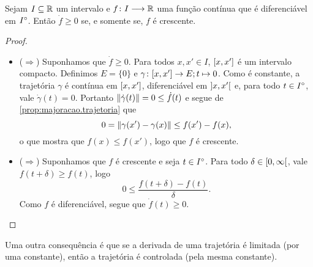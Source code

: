 \begin{proposition}
\label{prop:derivada.positiva.crescente}
Sejam $I \subseteq \mathbb{R}$ um intervalo e ${f}\colon {I} \longrightarrow {\mathbb{R}}$ uma função contínua que é diferenciável em ${I}^\circ$. Então $\dot f \geq 0$ se, e somente se, $f$ é crescente.
\end{proposition}
\begin{proof}
\begin{itemize}
\item ($\Rightarrow$) Suponhamos que $\dot f \geq 0$. Para todos $x,x' \in I$, $\left[{x},{x'}\right]$ é um intervalo compacto. Definimos $E=\{0\}$ e ${\gamma} \colon {\left[{x},{x'}\right]} \to {E}; {t} \mapsto 0$. Como é constante, a trajetória $\gamma$ é contínua em $\left[{x},{x'}\right]$, diferenciável em $\left]{x},{x'}\right[$ e, para todo $t \in {I}^\circ$, vale $\dot \gamma(t) = 0$. Portanto $\left\Vert{\dot \gamma(t)}\right\Vert = 0 \leq \dot f(t)$ e segue de \ref{prop:majoracao.trajetoria} que
	\begin{equation*}
	0 = \left\Vert{\gamma(x') - \gamma(x)}\right\Vert \leq f(x') - f(x),
	\end{equation*}
o que mostra que $f(x) \leq f(x')$, logo que $f$ é crescente.

\item ($\Rightarrow$) Suponhamos que $f$ é crescente e seja $t \in {I}^\circ$. Para todo $\delta \in \left[{0},{\infty}\right[$, vale $f(t+\delta) \geq f(t)$, logo
	\begin{equation*}
	0 \leq \frac{f(t+\delta) - f(t)}{\delta}.
	\end{equation*}
Como $f$ é diferenciável, segue que $\dot f(t) \geq 0$.
\end{itemize}
\end{proof}

Uma outra consequência é que se a derivada de uma trajetória é limitada (por uma constante), então a trajetória é controlada (pela mesma constante).

